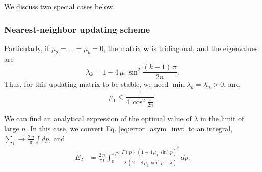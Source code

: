 \documentclass[reprint]{revtex4-1}
\newcommand{\Err}{E}
\begin{document}
We discuss two special cases below.



\subsubsection{Nearest-neighbor updating scheme}



Particularly, if $\mu_2 = \dots = \mu_b = 0$,
the matrix $\mathbf w$ is tridiagonal,
and the eigenvalues are
\begin{equation}
  \lambda_k = 1 - 4 \, \mu_1 \sin^2 \frac{(k - 1) \, \pi}{2n}.
\label{eq:wtridiag_eigenvalue}
\end{equation}
%
Thus, for this updating matrix to be stable,
we need
$\min \lambda_k = \lambda_n > 0$,
and
$$
\mu_1 < \frac{1}{4 \, \cos^2\frac{\pi}{2n} }.
$$



We can find an analytical expression
of the optimal value of $\lambda$
in the limit of large $n$.
%
In this case,
we convert Eq.
\eqref{eq:error_asym_invt}
to an integral,
$\sum_i \to \frac{2 \, n}{\pi} \int dp$, and
$$
\begin{aligned}
\Err_2
&=
\frac{2 \, n}{\pi \, t}
\int_0^{\pi/2}
  \frac{    \Gamma(p) \, \left(1 - 4 \, \mu_1 \, \sin^2 p \right)^2    }
       { \lambda \, \left(2 - 8 \, \mu_1 \, \sin^2 p - \lambda \right) }
\, dp.
\end{aligned}
$$
\end{document}
